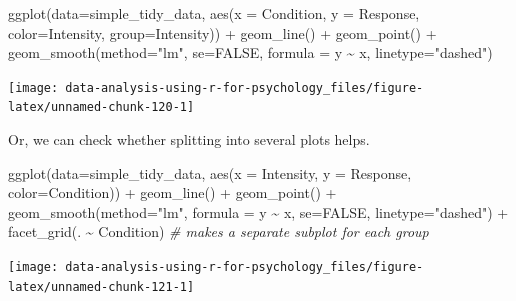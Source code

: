 \documentclass[
]{book}
\newenvironment{Shaded}{\begin{snugshade}}{\end{snugshade}}
\newcommand{\AttributeTok}[1]{\textcolor[rgb]{0.77,0.63,0.00}{#1}}
\newcommand{\CommentTok}[1]{\textcolor[rgb]{0.56,0.35,0.01}{\textit{#1}}}
\newcommand{\ConstantTok}[1]{\textcolor[rgb]{0.00,0.00,0.00}{#1}}
\newcommand{\FunctionTok}[1]{\textcolor[rgb]{0.00,0.00,0.00}{#1}}
\newcommand{\NormalTok}[1]{#1}
\newcommand{\SpecialCharTok}[1]{\textcolor[rgb]{0.00,0.00,0.00}{#1}}
\newcommand{\StringTok}[1]{\textcolor[rgb]{0.31,0.60,0.02}{#1}}
\begin{document}
\begin{Shaded}
\begin{Highlighting}[]
\FunctionTok{ggplot}\NormalTok{(}\AttributeTok{data=}\NormalTok{simple\_tidy\_data, }\FunctionTok{aes}\NormalTok{(}\AttributeTok{x =}\NormalTok{ Condition, }\AttributeTok{y =}\NormalTok{ Response, }\AttributeTok{color=}\NormalTok{Intensity, }\AttributeTok{group=}\NormalTok{Intensity)) }\SpecialCharTok{+} 
  \FunctionTok{geom\_line}\NormalTok{() }\SpecialCharTok{+}
  \FunctionTok{geom\_point}\NormalTok{() }\SpecialCharTok{+}
  \FunctionTok{geom\_smooth}\NormalTok{(}\AttributeTok{method=}\StringTok{"lm"}\NormalTok{, }\AttributeTok{se=}\ConstantTok{FALSE}\NormalTok{,  }\AttributeTok{formula =}\NormalTok{ y }\SpecialCharTok{\textasciitilde{}}\NormalTok{ x, }\AttributeTok{linetype=}\StringTok{"dashed"}\NormalTok{)}
\end{Highlighting}
\end{Shaded}

\begin{center}\texttt{[image: data-analysis-using-r-for-psychology\_files/figure-latex/unnamed-chunk-120-1]} \end{center}

Or, we can check whether splitting into several plots helps.

\begin{Shaded}
\begin{Highlighting}[]
\FunctionTok{ggplot}\NormalTok{(}\AttributeTok{data=}\NormalTok{simple\_tidy\_data, }\FunctionTok{aes}\NormalTok{(}\AttributeTok{x =}\NormalTok{ Intensity, }\AttributeTok{y =}\NormalTok{ Response, }\AttributeTok{color=}\NormalTok{Condition)) }\SpecialCharTok{+} 
  \FunctionTok{geom\_line}\NormalTok{() }\SpecialCharTok{+}
  \FunctionTok{geom\_point}\NormalTok{() }\SpecialCharTok{+}
  \FunctionTok{geom\_smooth}\NormalTok{(}\AttributeTok{method=}\StringTok{"lm"}\NormalTok{, }\AttributeTok{formula =}\NormalTok{ y }\SpecialCharTok{\textasciitilde{}}\NormalTok{ x, }\AttributeTok{se=}\ConstantTok{FALSE}\NormalTok{, }\AttributeTok{linetype=}\StringTok{"dashed"}\NormalTok{) }\SpecialCharTok{+}
  \FunctionTok{facet\_grid}\NormalTok{(. }\SpecialCharTok{\textasciitilde{}}\NormalTok{ Condition) }\CommentTok{\# makes a separate subplot for each group}
\end{Highlighting}
\end{Shaded}

\begin{center}\texttt{[image: data-analysis-using-r-for-psychology\_files/figure-latex/unnamed-chunk-121-1]} \end{center}
\end{document}
